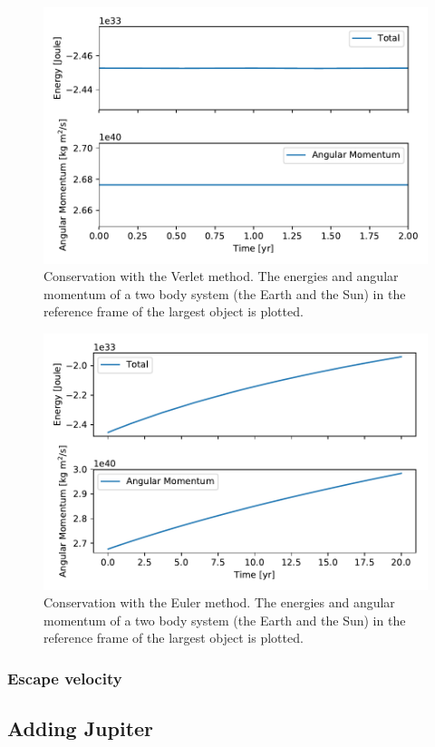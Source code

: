 \documentclass[10pt]{article}
\begin{document}
\begin{multicols}{2}
\begin{figure}[htpb]
    \centering
    \includegraphics[width=0.8\linewidth]{energy_conservation_verlet.pdf}
    \caption{Conservation with the Verlet method. The energies and
        angular momentum of a two body system (the Earth and the Sun) in
        the reference frame of the largest object is plotted.}
    \label{fig:energy_verlet}
\end{figure}

\begin{figure}[htpb]
    \centering
    \includegraphics[width=0.8\linewidth]{energy_conservation_euler.pdf}
    \caption{Conservation with the Euler method. The energies and angular
        momentum of a two body system (the
    Earth and the Sun) in the reference frame of the largest object is
plotted.}
    \label{fig:energy_verlet}
\end{figure}

\subsubsection{Escape velocity}

\subsection{Adding Jupiter}

\end{multicols}
\end{document}
